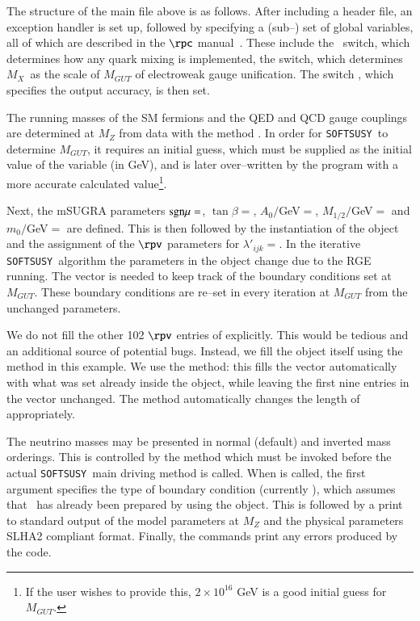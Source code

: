 \documentclass[pdflatex,final,3p,times]{elsarticle}
\def\SOFTSUSY{{\tt SOFTSUSY}}
\begin{document}
\normalsize The structure of the main file above is as follows.  After
including a header file, an exception handler is set up, followed by
specifying a (sub--) set of global variables, all of which are
described in the $\rpc$ manual~\cite{Allanach:2001kg}.  These include
the ~switch, which determines how any quark mixing is
implemented, the
 switch, which determines $M_X$~as
the scale of $M_{GUT}$ of electroweak gauge unification. The
switch 
 , which specifies the output
accuracy, is then set.

The running masses of the SM fermions and the QED and QCD gauge
couplings are determined at $M_Z$ from data with the method
.  In order for \SOFTSUSY~to determine $M_{GUT}$, it
requires an initial guess, which must be supplied as the initial value
of the variable  (in GeV), and is later over--written by
the program with a more accurate calculated value\footnote{If the user wishes
  to provide this, $2 \times 
  10^{16}$ GeV is a good initial guess for $M_{GUT}$.}.

Next, the mSUGRA parameters ${\rm
  sgn}\mu=$, $\tan \beta=$,
$A_0/$GeV$=$, $M_{1/2}/$GeV$=$  and
$m_0/$GeV$=$ are defined.  This is then followed by the instantiation
of the  object  and the assignment of the
$\rpv$ parameters  for
$\lambda'_{ijk}=$.  In the iterative \SOFTSUSY~algorithm the
parameters in the  object change due to the RGE
running.  The  vector is needed to keep track of the
boundary conditions set at $M_{GUT}$.  These boundary conditions are
re--set in every iteration at $M_{GUT}$ from the unchanged
 parameters.

We do not fill the other 102 $\rpv$ entries of 
explicitly. This would be tedious and an additional source of
potential bugs. Instead, we fill the  object itself
using the  method in this example.  We use the
 method: this fills the  vector
automatically with what was set already inside the 
object, while leaving the first nine entries in the vector unchanged.
The  method automatically changes the length of
 appropriately.  

The neutrino masses may be presented in normal (default) and inverted
mass orderings.  This is controlled by the method
 which must be invoked before the actual
\SOFTSUSY~main driving method  is called.  When
 is called, the first argument specifies the type of
boundary condition (currently ), which assumes that
~has already been prepared by using the 
object.  This is followed by a print to standard output of the model
parameters at $M_Z$ and the physical parameters SLHA2 compliant format.
Finally, the 
 commands print any errors produced by the code.
\end{document}
